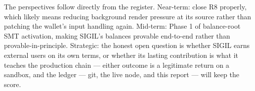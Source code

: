 The perspectives follow directly from the register. Near-term: close R8 properly, which likely means reducing background render pressure at its source rather than patching the wallet's input handling again. Mid-term: Phase 1 of balance-root SMT activation, making SIGIL's balances provable end-to-end rather than provable-in-principle. Strategic: the honest open question is whether SIGIL earns external users on its own terms, or whether its lasting contribution is what it teaches the production chain --- either outcome is a legitimate return on a sandbox, and the ledger --- git, the live node, and this report --- will keep the score.

